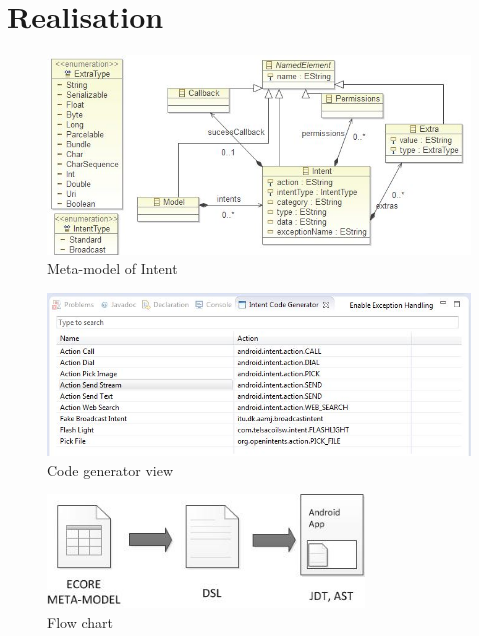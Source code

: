 \section{Realisation}

\begin{figure}[H]
  \centering
    \includegraphics[width=\textwidth]{metamodel}
  \caption{Meta-model of Intent}
\end{figure}

\begin{figure}[H]
  \centering
    \includegraphics[width=\textwidth]{codegenerator}
  \caption{Code generator view}
\end{figure}

\begin{figure}[H]
  \centering
    \includegraphics[width=0.75\textwidth]{flowchart}
  \caption{Flow chart}
\end{figure}